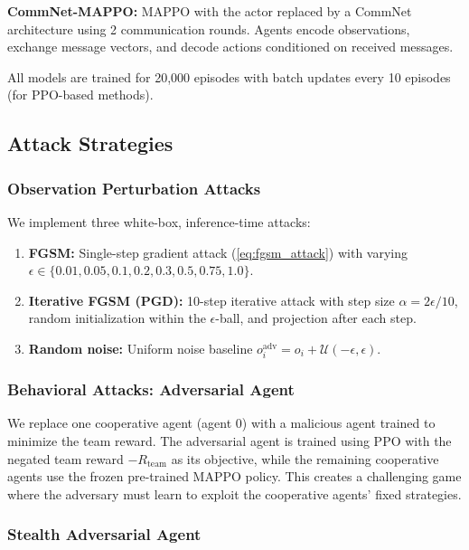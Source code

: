 \documentclass[12pt,a4paper]{article}
\begin{document}
\textbf{CommNet-MAPPO:} MAPPO with the actor replaced by a CommNet architecture using 2 communication rounds. Agents encode observations, exchange message vectors, and decode actions conditioned on received messages.

All models are trained for 20{,}000 episodes with batch updates every 10 episodes (for PPO-based methods).

\subsection{Attack Strategies}

\subsubsection{Observation Perturbation Attacks}

We implement three white-box, inference-time attacks:

\begin{enumerate}
    \item \textbf{FGSM:} Single-step gradient attack (\cref{eq:fgsm_attack}) with varying $\epsilon \in \{0.01, 0.05, 0.1, 0.2, 0.3, 0.5, 0.75, 1.0\}$.
    \item \textbf{Iterative FGSM (PGD):} 10-step iterative attack with step size $\alpha = 2\epsilon / 10$, random initialization within the $\epsilon$-ball, and projection after each step.
    \item \textbf{Random noise:} Uniform noise baseline $o_i^\text{adv} = o_i + \mathcal{U}(-\epsilon, \epsilon)$.
\end{enumerate}

\subsubsection{Behavioral Attacks: Adversarial Agent}

We replace one cooperative agent (agent 0) with a malicious agent trained to minimize the team reward. The adversarial agent is trained using PPO with the negated team reward $-R_\text{team}$ as its objective, while the remaining cooperative agents use the frozen pre-trained MAPPO policy. This creates a challenging game where the adversary must learn to exploit the cooperative agents' fixed strategies.

\subsubsection{Stealth Adversarial Agent}
\label{sec:stealth}
\end{document}
